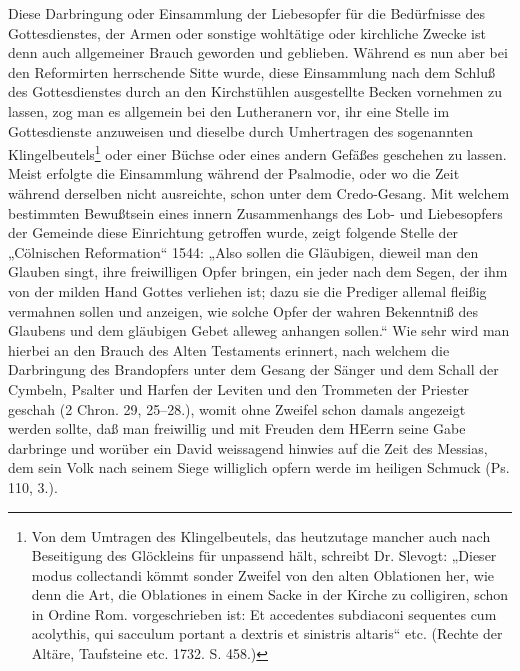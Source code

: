 Diese Darbringung oder Einsammlung der Liebesopfer für die Bedürfnisse des Gottesdienstes, der Armen oder sonstige wohltätige oder kirchliche Zwecke ist denn auch allgemeiner Brauch geworden und geblieben. Während es nun aber bei den Reformirten herrschende Sitte wurde, diese Einsammlung nach dem Schluß des Gottesdienstes durch an den Kirchstühlen ausgestellte Becken vornehmen zu lassen, zog man es allgemein bei den Lutheranern vor, ihr eine Stelle im Gottesdienste anzuweisen und dieselbe durch Umhertragen des sogenannten Klingelbeutels\footnote{Von dem Umtragen des Klingelbeutels, das heutzutage mancher auch nach Beseitigung des Glöckleins für unpassend hält, schreibt Dr. Slevogt: „Dieser modus collectandi kömmt sonder Zweifel von den alten Oblationen her, wie denn die Art, die Oblationes in einem Sacke in der Kirche zu colligiren, schon in Ordine Rom. vorgeschrieben ist: Et accedentes subdiaconi sequentes cum acolythis, qui sacculum portant a dextris et sinistris altaris“ etc. (Rechte der Altäre, Taufsteine etc. 1732. S. 458.)} oder einer Büchse oder eines andern Gefäßes geschehen zu lassen. Meist erfolgte die Einsammlung während der Psalmodie, oder wo die Zeit während derselben nicht ausreichte, schon unter dem Credo-Gesang. Mit welchem bestimmten Bewußtsein eines innern Zusammenhangs des Lob- und Liebesopfers der Gemeinde diese Einrichtung getroffen wurde, zeigt folgende Stelle der „Cölnischen Reformation“ 1544: „Also sollen die Gläubigen, dieweil man den Glauben singt, ihre freiwilligen Opfer bringen, ein jeder nach dem Segen, der ihm von der milden Hand Gottes verliehen ist; dazu sie die Prediger allemal fleißig vermahnen sollen und anzeigen, wie solche Opfer der wahren Bekenntniß des Glaubens und dem gläubigen Gebet alleweg anhangen sollen.“ Wie sehr wird man hierbei an den Brauch des Alten Testaments erinnert, nach welchem die Darbringung des Brandopfers unter dem Gesang der Sänger und dem Schall der Cymbeln, Psalter und Harfen der Leviten und den Trommeten der Priester geschah (2 Chron. 29, 25–28.), womit ohne Zweifel schon damals angezeigt werden sollte, daß man freiwillig und mit Freuden dem HEerrn seine Gabe darbringe und worüber ein David weissagend hinwies auf die Zeit des Messias, dem sein Volk nach seinem Siege williglich opfern werde im heiligen Schmuck (Ps. 110, 3.).

